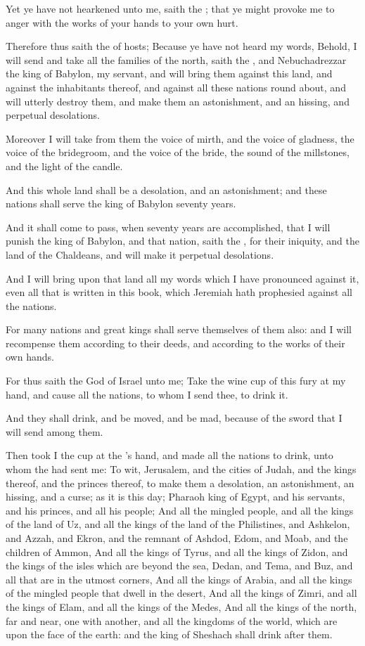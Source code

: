 \Verse Yet ye have not hearkened unto me, saith the \LORD; that ye might provoke me to anger with the works of your hands to your own hurt.

\Verse Therefore thus saith the \LORD of hosts; Because ye have not heard my words, \Verse Behold, I will send and take all the families of the north, saith the \LORD, and Nebuchadrezzar the king of Babylon, my servant, and will bring them against this land, and against the inhabitants thereof, and against all these nations round about, and will utterly destroy them, and make them an astonishment, and an hissing, and perpetual desolations.

\Verse Moreover I will take from them the voice of mirth, and the voice of gladness, the voice of the bridegroom, and the voice of the bride, the sound of the millstones, and the light of the candle.

\Verse And this whole land shall be a desolation, and an astonishment; and these nations shall serve the king of Babylon seventy years.

\Verse And it shall come to pass, when seventy years are accomplished, that I will punish the king of Babylon, and that nation, saith the \LORD, for their iniquity, and the land of the Chaldeans, and will make it perpetual desolations.

\Verse And I will bring upon that land all my words which I have pronounced against it, even all that is written in this book, which Jeremiah hath prophesied against all the nations.

\Verse For many nations and great kings shall serve themselves of them also: and I will recompense them according to their deeds, and according to the works of their own hands.

\Verse For thus saith the \LORD God of Israel unto me; Take the wine cup of this fury at my hand, and cause all the nations, to whom I send thee, to drink it.

\Verse And they shall drink, and be moved, and be mad, because of the sword that I will send among them.

\Verse Then took I the cup at the \LORD's hand, and made all the nations to drink, unto whom the \LORD had sent me: \Verse To wit, Jerusalem, and the cities of Judah, and the kings thereof, and the princes thereof, to make them a desolation, an astonishment, an hissing, and a curse; as it is this day; \Verse Pharaoh king of Egypt, and his servants, and his princes, and all his people; \Verse And all the mingled people, and all the kings of the land of Uz, and all the kings of the land of the Philistines, and Ashkelon, and Azzah, and Ekron, and the remnant of Ashdod, \Verse Edom, and Moab, and the children of Ammon, \Verse And all the kings of Tyrus, and all the kings of Zidon, and the kings of the isles which are beyond the sea, \Verse Dedan, and Tema, and Buz, and all that are in the utmost corners, \Verse And all the kings of Arabia, and all the kings of the mingled people that dwell in the desert, \Verse And all the kings of Zimri, and all the kings of Elam, and all the kings of the Medes, \Verse And all the kings of the north, far and near, one with another, and all the kingdoms of the world, which are upon the face of the earth: and the king of Sheshach shall drink after them.

